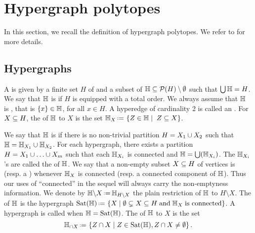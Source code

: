 
\section{Hypergraph polytopes} 
\label{s:hypergraph}

In this section, we recall the definition of hypergraph polytopes. 
We refer to \cite{DP-HP,COI} for more details. 


\subsection{Hypergraphs}
A  is given by a finite set $H$ of  and a subset of  ${\mathbb H}\subseteq {\cal P}(H)\setminus\emptyset$ such that $\bigcup {\mathbb H}=H$. 
We say that ${\mathbb H}$ is  if $H$ is equipped with a total order.
We always assume that ${\mathbb H}$ is , that is $\left\{x\right\}\in {\mathbb H}$, for all $x\in H$. 
A hyperedge of cardinality 2 is called an .  
For $X\subseteq H$, the  of ${\mathbb H}$ to $X$ is the set 
$\hyper{H}_X \eqdef   \setc{Z\in \hyper{H}}{\; Z\inc X}$.

We say that ${\mathbb H}$ is  if there is no non-trivial partition $H=X_1\cup X_2$ such that ${\mathbb H}={\mathbb H}_{X_1}\cup {\mathbb H}_{X_2}$. 
For each hypergraph, there exists a partition $H=X_1\cup\ldots\cup X_m$ such that each ${\mathbb H}_{X_i}$ is connected and ${\mathbb H}=\bigcup({\mathbb H}_{X_i})$.  
The ${\mathbb H}_{X_i}$'s are called the  of ${\mathbb H}$.
We say that a non-empty subset $X\subseteq H$ of vertices is  (resp. a ) whenever ${\mathbb H}_X$ is connected (resp. a connected component of ${\mathbb H}$).  Thus our uses of ``connected'' in the sequel will always carry the non-emptyness information.
We denote by $\restrH{H}{X}\eqdef  \hyper{H}_{H\setminus X}$ the plain restriction of ${\mathbb H}$ to $H \setminus X$.
The  of ${\mathbb H}$ is the hypergraph
$\Sat(\hyper{H})\eqdef  \setc{X}{\emptyset\incs X\inc H\;\mbox{and}\;\hyper{H}_X\;\mbox{is connected}}$.
A hypergraph is called  when ${\mathbb H}=\operatorname{Sat}({\mathbb H})$.  
The  of ${\mathbb H}$ to $X$ is the set $$\recrestr{\hyper{H}}{X}\eqdef  \setc{Z\cap X}{Z\in \Sat(\hyper{H}), Z\cap X\neq\emptyset}.$$

